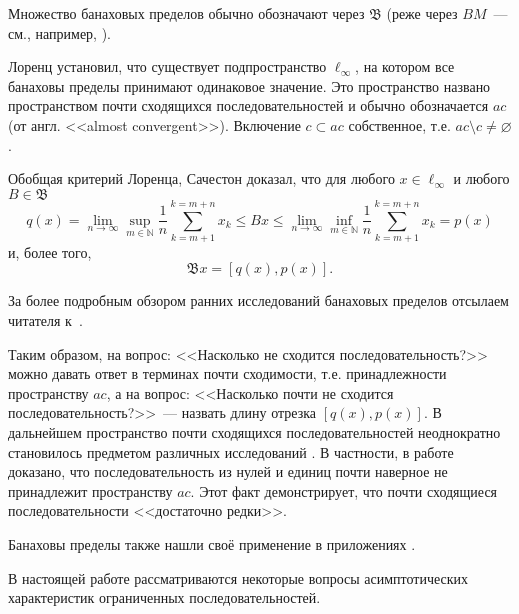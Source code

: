 Множество банаховых пределов обычно обозначают через $\mathfrak{B}$
(реже через $BM$~--- см., например, \cite{alekhno2012superposition,alekhno2015banach}).

Лоренц \cite{lorentz1948contribution} установил, что существует подпространство $\ell_\infty$,
на котором все банаховы пределы принимают одинаковое значение.
Это пространство названо пространством почти сходящихся последовательностей и обычно обозначается $ac$
(от англ. <<almost convergent>>).
Включение $c \subset ac$ собственное, т.е. $ac \setminus c \neq \varnothing$.


Обобщая критерий Лоренца, Сачестон \cite{sucheston1967banach} доказал, что для любого $x\in\ell_\infty$
и любого $B\in\mathfrak{B}$
\begin{equation*}
	q(x) =
	\lim_{n\to\infty} \sup_{m\in\mathbb{N}} \frac{1}{n} \sum_{k=m+1}^{k=m+n} x_k
	\leq
	Bx
	\leq
	\lim_{n\to\infty} \inf_{m\in\mathbb{N}} \frac{1}{n} \sum_{k=m+1}^{k=m+n} x_k
	= p(x)
\end{equation*}
и, более того,
\begin{equation*}
	\mathfrak{B}x = [q(x), p(x)]
	.
\end{equation*}

За более подробным обзором ранних исследований банаховых пределов отсылаем читателя к~\cite{day1973normed,greenleaf1969invariant}.

Таким образом, на вопрос: <<Насколько не сходится последовательность?>> %
можно давать ответ в терминах почти сходимости, т.е. принадлежности пространству $ac$,
а на вопрос: <<Насколько почти не сходится последовательность?>>~---
назвать длину отрезка $[q(x), p(x)]$.
В дальнейшем пространство почти сходящихся последовательностей неоднократно становилось предметом
различных исследований
\cite{semenov2006space,usachev2008transformations}.
В частности, в работе~\cite{connor1990almost} доказано,
что последовательность из нулей и единиц почти наверное не принадлежит пространству $ac$.
Этот факт демонстрирует, что почти сходящиеся последовательности <<достаточно редки>>.


Банаховы пределы также нашли своё применение в приложениях
\cite{semenov2015banachtraces,semenov2009fourier,strukova2015spectres}.



В настоящей работе рассматриваются некоторые вопросы асимптотических характеристик ограниченных последовательностей.

